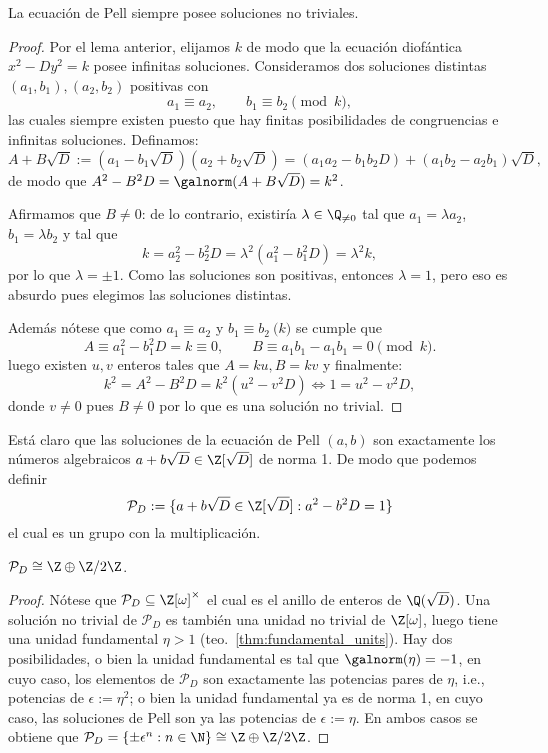 \documentclass[teoria-numeros.tex]{subfiles}
\begin{document}
\begin{thm}
	La ecuación de Pell siempre posee soluciones no triviales.
\end{thm}
\begin{proof}
	Por el lema anterior, elijamos $k$ de modo que la ecuación diofántica $x^2 - Dy^2 = k$ posee infinitas soluciones.
	Consideramos dos soluciones distintas $(a_1, b_1), (a_2, b_2)$ positivas con
	$$ a_1 \equiv a_2, \qquad b_1 \equiv b_2 \pmod k, $$
	las cuales siempre existen puesto que hay finitas posibilidades de congruencias e infinitas soluciones.
	Definamos:
	$$ A + B\sqrt{D} := (a_1 - b_1\sqrt{D})(a_2 + b_2\sqrt{D}) = (a_1a_2 - b_1b_2D) + (a_1b_2 - a_2b_1)\sqrt{D}, $$
	de modo que $A^2 - B^2D = \galnorm(A + B\sqrt{D}) = k^2$.

	Afirmamos que $B \ne 0$: de lo contrario, existiría $\lambda \in \Q_{\ne 0}$ tal que $a_1 = \lambda a_2$, $b_1 = \lambda b_2$ y tal que
	$$ k = a_2^2 - b_2^2 D = \lambda^2(a_1^2 - b_1^2 D) = \lambda^2k, $$
	por lo que $\lambda = \pm 1$.
	Como las soluciones son positivas, entonces $\lambda = 1$, pero eso es absurdo pues elegimos las soluciones distintas.

	Además nótese que como $a_1 \equiv a_2$ y $b_1 \equiv b_2 \pod k$ se cumple que
	$$ A \equiv a_1^2 - b_1^2D = k \equiv 0, \qquad B \equiv a_1b_1 - a_1b_1 = 0\pmod k. $$
	luego existen $u, v$ enteros tales que $A = ku, B = kv$ y finalmente:
	$$ k^2 = A^2 - B^2D = k^2(u^2 - v^2D) \iff 1 = u^2 - v^2D, $$
	donde $v \ne 0$ pues $B \ne 0$ por lo que es una solución no trivial.
\end{proof}

Está claro que las soluciones de la ecuación de Pell $(a, b)$ son exactamente los números algebraicos $a + b\sqrt{D} \in \Z[\sqrt{D}]$ de norma 1.
De modo que podemos definir
$$ \mathcal{P}_D := \{ a + b\sqrt{D} \in \Z[\sqrt{D}] : a^2 - b^2D = 1 \} $$
el cual es un grupo con la multiplicación.
\begin{thm}
	$\mathcal{P}_D \cong \Z \oplus \Z/2\Z$.
\end{thm}
\begin{proof}
	Nótese que $\mathcal{P}_D \subseteq \Z[\omega]^\times$ el cual es el anillo de enteros de $\Q(\sqrt{D})$.
	Una solución no trivial de $\mathcal{P}_D$ es también una unidad no trivial de $\Z[\omega]$,
	luego tiene una unidad fundamental $\eta > 1$ (teo.~\ref{thm:fundamental_units}).
	Hay dos posibilidades, o bien la unidad fundamental es tal que $\galnorm(\eta) = -1$, en cuyo caso, los elementos de $\mathcal{P}_D$
	son exactamente las potencias pares de $\eta$, i.e., potencias de $\epsilon := \eta^2$;
	o bien la unidad fundamental ya es de norma 1, en cuyo caso, las soluciones de Pell son ya las potencias de $\epsilon := \eta$.
	En ambos casos se obtiene que $\mathcal{P}_D = \{ \pm \epsilon^n : n \in \N \} \cong \Z \oplus \Z/2\Z$.
\end{proof}
\end{document}
